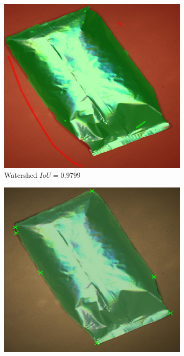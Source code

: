 


\begin{figure}
	\centering
	\begin{subfigure}[t]{0.3\textwidth}
		\centering
		\includegraphics[width=\textwidth]{figures/appendix/method_predictions/bag21_watershed.png}
		\caption{Watershed $ IoU = 0.9799 $}
	\end{subfigure}
	\hfill
	\begin{subfigure}[t]{0.3\textwidth}
		\centering
		\includegraphics[width=\textwidth]{figures/appendix/method_predictions/bag21_dextr.png}

\end{subfigure}
\end{figure}
